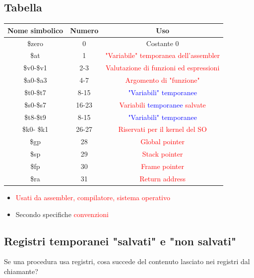 \subsection{Tabella}
\begin{center}
    \begin{tabular}{ |c|c|c| }
        \hline
        \textbf{Nome simbolico} & \textbf{Numero} & \textbf{Uso} \\
        \hline
        \$zero & 0 & Costante 0 \\ 
        \hline
        \$at & 1 & \textcolor{red}{"Variabile" temporanea dell'assembler} \\
        \hline
        \$v0-\$v1 & 2-3 & \textcolor{red}{Valutazione di funzioni ed espressioni} \\
        \hline
        \$a0-\$a3 & 4-7 & \textcolor{red}{Argomento di "funzione"}\\
        \hline
        \$t0-\$t7 & 8-15 & \textcolor{blue}{"Variabili" temporanee} \\
        \hline
        \$s0-\$s7 & 16-23 & \textcolor{red}{Variabili} \textcolor{blue}{temporanee} \textcolor{red}{salvate} \\
        \hline
        \$t8-\$t9 & 8-15 & \textcolor{blue}{"Variabili" temporanee} \\
        \hline
        \$k0- \$k1 & 26-27 & \textcolor{red}{Riservati per il kernel del SO} \\
        \hline
        \$gp & 28 & \textcolor{red}{Global pointer} \\
        \hline
        \$sp & 29 & \textcolor{red}{Stack pointer} \\
        \hline
        \$fp & 30 & \textcolor{red}{Frame pointer} \\
        \hline
        \$ra & 31 & \textcolor{red}{Return address} \\
        \hline
    \end{tabular}

    \begin{itemize}
        \item \textcolor{red}{Usati da assembler, compilatore, sistema operativo}
        \item Secondo specifiche \textcolor{red}{convenzioni}
    \end{itemize}
\end{center}

\subsection{Registri temporanei "salvati" e "non salvati"}
Se una procedura usa registri, cosa succede del contenuto lasciato nei registri dal chiamante?

